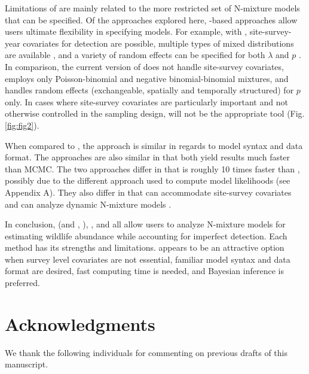 \documentclass[article]{jss}
\begin{document}
Limitations of  are mainly related to the more restricted set of N-mixture models that can be specified. Of the approaches explored here, -based approaches allow users ultimate flexibility in specifying models. For example, with , site-survey-year covariates for detection are possible, multiple types of mixed distributions are available \citep{Joseph_Elkin_Martin_Possingham_2009,Martin_Royle_Mackenzie_Edwards_Kery_Gardner_2011}, and a variety of random effects can be specified for both $\lambda$ and $p$ \citep{Kery_Schaub_2011}. In comparison, the current version of  does not handle site-survey covariates, employs only Poisson-binomial and negative binomial-binomial mixtures, and handles random effects (exchangeable, spatially and temporally structured) for $p$ only. In cases where site-survey covariates are particularly important and not otherwise controlled in the sampling design,  will not be the appropriate tool (Fig. \ref{fig:fig2}).

When compared to , the  approach is similar in regards to model syntax and data format. The approaches are also similar in that both yield results much faster than MCMC. The two approaches differ in that  is roughly 10 times faster than , possibly due to the different approach used to compute model likelihoods (see Appendix A). They also differ in that  can accommodate site-survey covariates and can analyze dynamic N-mixture models \citep{Chandler_Royle_King_2011, Dail_Madsen_2011}.

In conclusion,  (and , ), , and  all allow users to analyze N-mixture models for estimating wildlife abundance while accounting for imperfect detection. Each method has its strengths and limitations.  appears to be an attractive option when survey level covariates are not essential, familiar model syntax and data format are desired, fast computing time is needed, and Bayesian inference is preferred.

\section*{Acknowledgments}
We thank the following individuals for commenting on previous drafts of this manuscript.


\end{document}
